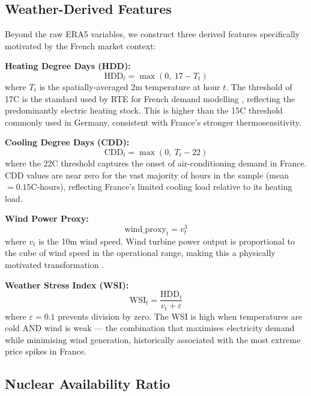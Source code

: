 \subsection{Weather-Derived Features}

Beyond the raw ERA5 variables, we construct three derived features specifically motivated by the French market context:

\textbf{Heating Degree Days (HDD):}
\begin{equation}
  \text{HDD}_t = \max(0,\ 17 - T_t)
\end{equation}
where $T_t$ is the spatially-averaged 2m temperature at hour $t$. The threshold of 17\textdegree C is the standard used by RTE for French demand modelling \citep{rte2023}, reflecting the predominantly electric heating stock. This is higher than the 15\textdegree C threshold commonly used in Germany, consistent with France's stronger thermosensitivity.

\textbf{Cooling Degree Days (CDD):}
\begin{equation}
  \text{CDD}_t = \max(0,\ T_t - 22)
\end{equation}
where the 22\textdegree C threshold captures the onset of air-conditioning demand in France. CDD values are near zero for the vast majority of hours in the sample (mean $= 0.15$\textdegree C-hours), reflecting France's limited cooling load relative to its heating load.

\textbf{Wind Power Proxy:}
\begin{equation}
  \text{wind\_proxy}_t = v_t^3
\end{equation}
where $v_t$ is the 10m wind speed. Wind turbine power output is proportional to the cube of wind speed in the operational range, making this a physically motivated transformation \citep{staffell2016}.

\textbf{Weather Stress Index (WSI):}
\begin{equation}
  \text{WSI}_t = \frac{\text{HDD}_t}{v_t + \varepsilon}
\end{equation}
where $\varepsilon = 0.1$ prevents division by zero. The WSI is high when temperatures are cold AND wind is weak — the combination that maximises electricity demand while minimising wind generation, historically associated with the most extreme price spikes in France.

\subsection{Nuclear Availability Ratio}

